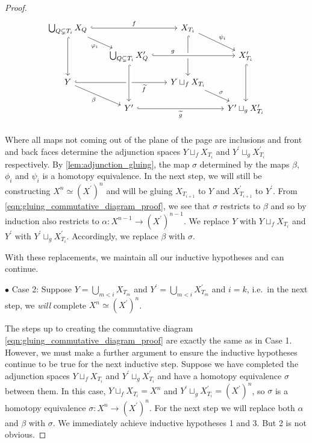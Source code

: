 \documentclass[class=article, crop=false]{standalone}
\begin{document}
\begin{proof}
    \begin{equation}
        \begin{tikzcd}[row sep=scriptsize, column sep=scriptsize]
            \bigcup_{Q \subsetneq T_i} X_{Q} \ar[dr, "\phi_i"'] \ar[rr, hookrightarrow, "f"] \ar[dd, hookrightarrow]     &  &   X_{T_i} \ar[dr, "\psi_i"] \ar[dd, hookrightarrow]  &  \\
            &   \bigcup_{Q \subsetneq T_i} X^\prime_{Q} \ar[rr, crossing over, hookrightarrow, "g" near start] & &  X^\prime_{T_i}\ar[dd, hookrightarrow]                         \\
            Y \ar[dr, "\beta"'] \ar[rr, hookrightarrow, "\widetilde{f}"', near end]  & &   Y \sqcup_f X_{T_i} \ar[dr, "\sigma"] &                                              \\
            &   Y^\prime \ar[rr, hookrightarrow, "\widetilde{g}"']  \ar[from=uu, crossing over, hookrightarrow]    &    &   Y^\prime\sqcup_g X^\prime_{T_i}                     \\
        \end{tikzcd}
    \label{eqn:gluing_commutative_diagram_proof}
    \end{equation}
    Where all maps not coming out of the plane of the page are inclusions and front and back faces determine the adjunction spaces $ Y \sqcup_f X_{T_i}$ and $Y^\prime\sqcup_g X^\prime_{T_i}$ respectively. By \cref{lem:adjunction_gluing}, the map $\sigma$ determined by the maps $\beta$, $\phi_i$ and $\psi_i$ is a homotopy equivalence.
    In the next step, we will still be constructing $X^n \simeq (X^\prime)^n$ and will be gluing $X_{T_{i+1}}$ to $Y$ and $X^\prime_{T_{i+1}}$ to $Y^\prime$. From \eqref{eqn:gluing_commutative_diagram_proof}, we see that $\sigma$ restricts to $\beta$ and so by induction also restricts to $\alpha \colon X^{n-1} \to (X^\prime)^{n-1}$. We replace $Y$ with $ Y \sqcup_f X_{T_i}$ and $Y^\prime$ with $Y^\prime\sqcup_g X^\prime_{T_i}$. Accordingly, we replace $\beta$ with $\sigma$. 

    With these replacements, we maintain all our inductive hypotheses and can continue.

    $\bullet$ Case 2: Suppose $Y = \bigcup_{m < i} X_{T_m}$ and $Y^\prime = \bigcup_{m < i} X^\prime_{T_m}$ and $i = k$, i.e.~in the next step, we \emph{will} complete $X^n \simeq (X^\prime)^n$.

    The steps up to creating the commutative diagram \eqref{eqn:gluing_commutative_diagram_proof} are exactly the same as in Case 1. However, we must make a further argument to ensure the inductive hypotheses continue to be true for the next inductive step. Suppose we have completed the adjunction spaces $ Y \sqcup_f X_{T_i}$ and $Y^\prime\sqcup_g X^\prime_{T_i}$ and have a homotopy equivalence $\sigma$ between them. In this case, $ Y \sqcup_f X_{T_i} = X^n$ and $Y^\prime\sqcup_g X^\prime_{T_i} = (X^\prime)^{n}$, so $\sigma$ is a homotopy equivalence $\sigma \colon X^n \to (X^\prime)^n$. For the next step we will replace both $\alpha$ and $\beta$ with $\sigma$. We immediately achieve inductive hypotheses 1 and 3. But 2 is not obvious.
    

\end{proof}
\end{document}
